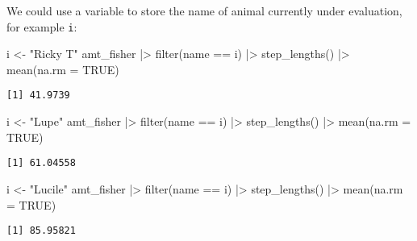 \documentclass[ignorenonframetext,,t]{beamer}
\newenvironment{Shaded}{\begin{snugshade}}{\end{snugshade}}
\newcommand{\AttributeTok}[1]{\textcolor[rgb]{0.77,0.63,0.00}{#1}}
\newcommand{\ConstantTok}[1]{\textcolor[rgb]{0.00,0.00,0.00}{#1}}
\newcommand{\FunctionTok}[1]{\textcolor[rgb]{0.00,0.00,0.00}{#1}}
\newcommand{\NormalTok}[1]{#1}
\newcommand{\OtherTok}[1]{\textcolor[rgb]{0.56,0.35,0.01}{#1}}
\newcommand{\SpecialCharTok}[1]{\textcolor[rgb]{0.00,0.00,0.00}{#1}}
\newcommand{\StringTok}[1]{\textcolor[rgb]{0.31,0.60,0.02}{#1}}
\begin{document}
\begin{frame}[fragile]
We could use a variable to store the name of animal currently under
evaluation, for example \texttt{i}:

\begin{Shaded}
\begin{Highlighting}[]
\NormalTok{i }\OtherTok{\textless{}{-}} \StringTok{"Ricky T"}
\NormalTok{amt\_fisher }\SpecialCharTok{|\textgreater{}} \FunctionTok{filter}\NormalTok{(name }\SpecialCharTok{==}\NormalTok{ i) }\SpecialCharTok{|\textgreater{}} 
  \FunctionTok{step\_lengths}\NormalTok{() }\SpecialCharTok{|\textgreater{}} \FunctionTok{mean}\NormalTok{(}\AttributeTok{na.rm =} \ConstantTok{TRUE}\NormalTok{)}
\end{Highlighting}
\end{Shaded}

\begin{verbatim}
[1] 41.9739
\end{verbatim}

\begin{Shaded}
\begin{Highlighting}[]
\NormalTok{i }\OtherTok{\textless{}{-}} \StringTok{"Lupe"}
\NormalTok{amt\_fisher }\SpecialCharTok{|\textgreater{}} \FunctionTok{filter}\NormalTok{(name }\SpecialCharTok{==}\NormalTok{ i) }\SpecialCharTok{|\textgreater{}} 
  \FunctionTok{step\_lengths}\NormalTok{() }\SpecialCharTok{|\textgreater{}} \FunctionTok{mean}\NormalTok{(}\AttributeTok{na.rm =} \ConstantTok{TRUE}\NormalTok{)}
\end{Highlighting}
\end{Shaded}

\begin{verbatim}
[1] 61.04558
\end{verbatim}

\begin{Shaded}
\begin{Highlighting}[]
\NormalTok{i }\OtherTok{\textless{}{-}} \StringTok{"Lucile"}
\NormalTok{amt\_fisher }\SpecialCharTok{|\textgreater{}} \FunctionTok{filter}\NormalTok{(name }\SpecialCharTok{==}\NormalTok{ i) }\SpecialCharTok{|\textgreater{}} 
  \FunctionTok{step\_lengths}\NormalTok{() }\SpecialCharTok{|\textgreater{}} \FunctionTok{mean}\NormalTok{(}\AttributeTok{na.rm =} \ConstantTok{TRUE}\NormalTok{)}
\end{Highlighting}
\end{Shaded}

\begin{verbatim}
[1] 85.95821
\end{verbatim}
\end{frame}
\end{document}
